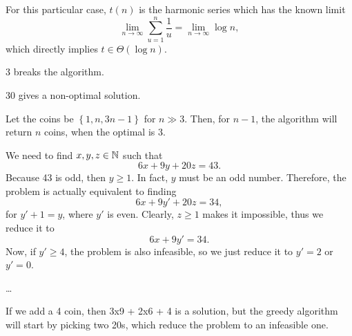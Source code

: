 For this particular case, $t(n)$ is the harmonic series which has the known limit \[
\lim_{n \to \infty} \sum_{u=1}^{n} \frac{1}{u} = \lim_{n \to \infty} \log n
,\] which directly implies $t \in \Theta(\log n)$.


3 breaks the algorithm.


30 gives a non-optimal solution.


Let the coins be $\left\{ 1, n, 3n - 1 \right\} $ for $n\gg 3$.
Then, for $n-1$, the algorithm will return $n$ coins, when the optimal is 3.


We need to find $x,y,z \in \mathbb{N}$ such that \[
6x + 9y + 20z = 43
.\] Because 43 is odd, then $y\ge 1$. In fact, $y$ must be an odd number.
Therefore, the problem is actually equivalent to finding \[
6x + 9y' + 20z = 34
,\] for $y'+1= y$, where $y'$ is even. 
Clearly, $z\ge 1$ makes it impossible, thus we reduce it to \[
6x + 9y' = 34
.\] Now, if $y'\ge 4$, the problem is also infeasible, so we just reduce it to $y' = 2$ or  $y'=0$.

 \ldots

If we add a 4 coin, then 3x9 + 2x6 + 4 is a solution, but the greedy algorithm will start by picking two 20s, which reduce the problem to an infeasible one. 
 

